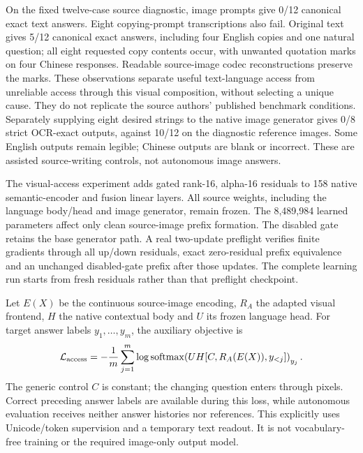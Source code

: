 \documentclass[10pt,a4paper]{article}
\begin{document}
On the fixed twelve-case source diagnostic, image prompts give 0/12 canonical
exact text answers. Eight copying-prompt transcriptions also fail. Original
text gives 5/12 canonical exact answers, including four English copies and
one natural question; all eight requested copy contents occur, with unwanted
quotation marks on four Chinese responses. Readable source-image codec
reconstructions preserve the marks. These observations separate useful
text-language access from unreliable access through this visual composition,
without selecting a unique cause. They do not replicate the source authors'
published benchmark conditions. Separately supplying eight desired strings to
the native image generator gives 0/8 strict OCR-exact outputs, against 10/12
on the diagnostic reference images. Some English outputs remain legible;
Chinese outputs are blank or incorrect. These are assisted source-writing
controls, not autonomous image answers.

The visual-access experiment adds gated rank-16, alpha-16 residuals to
158 native semantic-encoder and fusion linear layers. All source weights,
including the language body/head and image generator, remain frozen. The
8,489,984 learned parameters affect only clean source-image prefix formation.
The disabled gate retains the base generator path. A real two-update preflight
verifies finite gradients through all up/down residuals, exact zero-residual
prefix equivalence and an unchanged disabled-gate prefix after those updates.
The complete learning run starts from fresh residuals rather than that
preflight checkpoint.

Let $E(X)$ be the continuous source-image encoding, $R_A$ the adapted visual
frontend, $H$ the native contextual body and $U$ its frozen language head.
For target answer labels $y_1,\ldots,y_m$, the auxiliary objective is
\begin{equation}
\mathcal L_{\rm access}=-\frac{1}{m}\sum_{j=1}^{m}
\log\operatorname{softmax}\!\left(UH[C,R_A(E(X)),y_{<j}]\right)_{y_j}.
\end{equation}
The generic control $C$ is constant; the changing question enters through
pixels. Correct preceding answer labels are available during this loss, while
autonomous evaluation receives neither answer histories nor references.
This explicitly uses Unicode/token supervision and a temporary text readout.
It is not vocabulary-free training or the required image-only output model.
\end{document}
